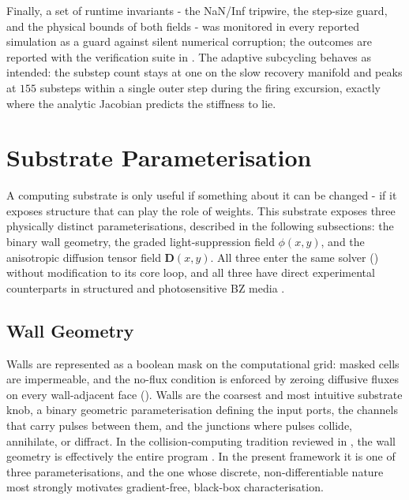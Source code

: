 Finally, a set of runtime invariants - the NaN/Inf tripwire, the step-size guard, and the physical bounds of both fields - was monitored in every reported simulation as a guard against silent numerical corruption; the outcomes are reported with the verification suite in .
The adaptive subcycling behaves as intended: the substep count stays at one on the slow recovery manifold and peaks at $155$ substeps within a single outer step during the firing excursion, exactly where the analytic Jacobian predicts the stiffness to lie.

\section{Substrate Parameterisation}
\label{sec:meth_parameterisation}

A computing substrate is only useful if something about it can be changed - if it exposes structure that can play the role of weights.
This substrate exposes three physically distinct parameterisations, described in the following subsections: the binary wall geometry, the graded light-suppression field $\phi(x,y)$, and the anisotropic diffusion tensor field $\mathbf{D}(x,y)$.
All three enter the same solver () without modification to its core loop, and all three have direct experimental counterparts in structured and photosensitive BZ media \cite{sakurai2002design, steinbock1995anisotropy}.

\subsection{Wall Geometry}
\label{sec:meth_walls}

Walls are represented as a boolean mask on the computational grid: masked cells are impermeable, and the no-flux condition is enforced by zeroing diffusive fluxes on every wall-adjacent face ().
Walls are the coarsest and most intuitive substrate knob, a binary geometric parameterisation defining the input ports, the channels that carry pulses between them, and the junctions where pulses collide, annihilate, or diffract.
In the collision-computing tradition reviewed in , the wall geometry is effectively the entire program \cite{toth1995logic, adamatzky2002xor}. In the present framework it is one of three parameterisations, and the one whose discrete, non-differentiable nature most strongly motivates gradient-free, black-box characterisation.

